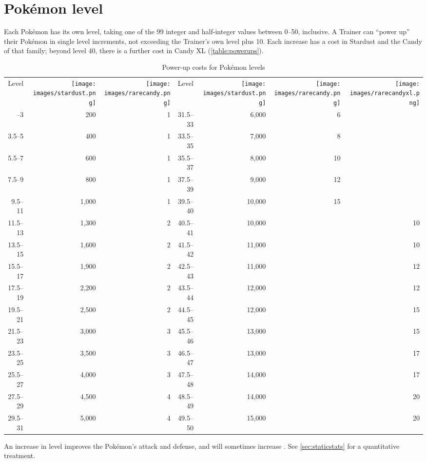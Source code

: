 \section{Pokémon level\label{sec:plevel}}
Each Pokémon has its own level, taking one of the 99 integer and half-integer
 values between 0--50, inclusive.
A Trainer can ``power up'' their Pokémon in single level increments,
 not exceeding the Trainer's own level plus 10.
Each increase has a cost in Stardust and the Candy of that family; beyond level 40, there
  is a further cost in Candy XL (\autoref{table:powerups}).
\begin{table}
\centering
\begin{tabular}[ht]{rrr|rrrr}
Level &
\texttt{[image: images/stardust.png]} &
\texttt{[image: images/rarecandy.png]} &
Level &
\texttt{[image: images/stardust.png]} &
\texttt{[image: images/rarecandy.png]} &
\texttt{[image: images/rarecandyxl.png]} \\
\Midrule
1.5--3 &   200 & 1 & 31.5--33 &  6,000 &  6 & \\
3.5--5 &   400 & 1 & 33.5--35 &  7,000 &  8 & \\
5.5--7 &   600 & 1 & 35.5--37 &  8,000 & 10 & \\
7.5--9 &   800 & 1 & 37.5--39 &  9,000 & 12 & \\
9.5--11 & 1,000 & 1 & 39.5--40 & 10,000 & 15 & \\
11.5--13 & 1,300 & 2 & 40.5--41 & 10,000 &    & 10 \\
13.5--15 & 1,600 & 2 & 41.5--42 & 11,000 &    & 10 \\
15.5--17 & 1,900 & 2 & 42.5--43 & 11,000 &    & 12 \\
17.5--19 & 2,200 & 2 & 43.5--44 & 12,000 &    & 12 \\
19.5--21 & 2,500 & 2 & 44.5--45 & 12,000 &    & 15 \\
21.5--23 & 3,000 & 3 & 45.5--46 & 13,000 &    & 15 \\
23.5--25 & 3,500 & 3 & 46.5--47 & 13,000 &    & 17 \\
25.5--27 & 4,000 & 3 & 47.5--48 & 14,000 &    & 17 \\
27.5--29 & 4,500 & 4 & 48.5--49 & 14,000 &    & 20 \\
29.5--31 & 5,000 & 4 & 49.5--50 & 15,000 &    & 20 \\
\end{tabular}
\caption{Power-up costs for Pokémon levels\label{table:powerups}}
\end{table}
An increase in level improves the Pokémon's attack and defense, and
  will sometimes increase \MHP\@.
See \autoref{sec:staticstats} for a quantitative treatment.

